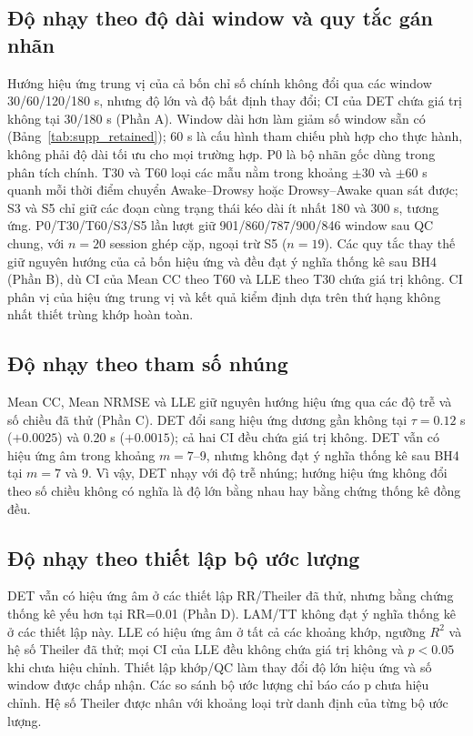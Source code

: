 \documentclass[conference,a4paper]{IEEEtran}
\begin{document}
\subsection{Độ nhạy theo độ dài window và quy tắc gán nhãn}\label{sec:supp_6_1}
Hướng hiệu ứng trung vị của cả bốn chỉ số chính không đổi qua các window 30/60/120/180 s, nhưng độ lớn và độ bất định thay đổi; CI của DET chứa giá trị không tại 30/180 s (Phần A). Window dài hơn làm giảm số window sẵn có (Bảng~\ref{tab:supp_retained}); 60 s là cấu hình tham chiếu phù hợp cho thực hành, không phải độ dài tối ưu cho mọi trường hợp. P0 là bộ nhãn gốc dùng trong phân tích chính. T30 và T60 loại các mẫu nằm trong khoảng $\pm30$ và $\pm60$ s quanh mỗi thời điểm chuyển Awake--Drowsy hoặc Drowsy--Awake quan sát được; S3 và S5 chỉ giữ các đoạn cùng trạng thái kéo dài ít nhất 180 và 300 s, tương ứng. P0/T30/T60/S3/S5 lần lượt giữ 901/860/787/900/846 window sau QC chung, với $n=20$ session ghép cặp, ngoại trừ S5 ($n=19$). Các quy tắc thay thế giữ nguyên hướng của cả bốn hiệu ứng và đều đạt ý nghĩa thống kê sau BH4 (Phần B), dù CI của Mean CC theo T60 và LLE theo T30 chứa giá trị không. CI phân vị của hiệu ứng trung vị và kết quả kiểm định dựa trên thứ hạng không nhất thiết trùng khớp hoàn toàn.

\subsection{Độ nhạy theo tham số nhúng}\label{sec:supp_6_2}
Mean CC, Mean NRMSE và LLE giữ nguyên hướng hiệu ứng qua các độ trễ và số chiều đã thử (Phần C). DET đổi sang hiệu ứng dương gần không tại $\tau=0.12$ s ($+0.0025$) và 0.20 s ($+0.0015$); cả hai CI đều chứa giá trị không. DET vẫn có hiệu ứng âm trong khoảng $m=7$--9, nhưng không đạt ý nghĩa thống kê sau BH4 tại $m=7$ và 9. Vì vậy, DET nhạy với độ trễ nhúng; hướng hiệu ứng không đổi theo số chiều không có nghĩa là độ lớn bằng nhau hay bằng chứng thống kê đồng đều.

\subsection{Độ nhạy theo thiết lập bộ ước lượng}\label{sec:supp_6_3}
DET vẫn có hiệu ứng âm ở các thiết lập RR/Theiler đã thử, nhưng bằng chứng thống kê yếu hơn tại RR=0.01 (Phần D). LAM/TT không đạt ý nghĩa thống kê ở các thiết lập này. LLE có hiệu ứng âm ở tất cả các khoảng khớp, ngưỡng $R^2$ và hệ số Theiler đã thử; mọi CI của LLE đều không chứa giá trị không và $p<0.05$ khi chưa hiệu chỉnh. Thiết lập khớp/QC làm thay đổi độ lớn hiệu ứng và số window được chấp nhận. Các so sánh bộ ước lượng chỉ báo cáo p chưa hiệu chỉnh. Hệ số Theiler được nhân với khoảng loại trừ danh định của từng bộ ước lượng.
\end{document}

